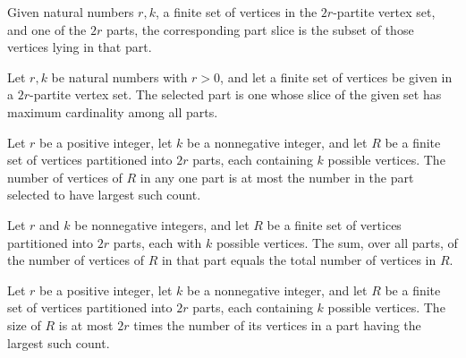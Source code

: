 \begin{definition}
\label{FABL.remainingPartSlice}
\leanok
{}
Given natural numbers $r,k$, a finite set of vertices in the $2r$-partite vertex set,
and one of the $2r$ parts, the corresponding part slice is the subset of those vertices
lying in that part.
\end{definition}

\begin{definition}
\label{FABL.greedyLargestPart}
\leanok
{}
Let $r,k$ be natural numbers with $r>0$, and let a finite set of vertices be given in a
$2r$-partite vertex set. The selected part is one whose slice of the given set has
maximum cardinality among all parts.
\end{definition}

\begin{theorem}
\label{FABL.remainingPartSlice_card_le_greedyLargestPart}
\leanok
{}
Let $r$ be a positive integer, let $k$ be a nonnegative integer, and let $R$ be a finite
set of vertices partitioned into $2r$ parts, each containing $k$ possible vertices. The
number of vertices of $R$ in any one part is at most the number in the part selected to
have largest such count.
\end{theorem}

\begin{theorem}
\label{FABL.sum_card_remainingPartSlice}
\leanok
{}
Let $r$ and $k$ be nonnegative integers, and let $R$ be a finite set of vertices
partitioned into $2r$ parts, each with $k$ possible vertices. The sum, over all parts,
of the number of vertices of $R$ in that part equals the total number of vertices in
$R$.
\end{theorem}

\begin{theorem}
\label{FABL.remaining_card_le_parts_mul_largest}
\leanok
{}
Let $r$ be a positive integer, let $k$ be a nonnegative integer, and let $R$ be a finite
set of vertices partitioned into $2r$ parts, each containing $k$ possible vertices. The
size of $R$ is at most $2r$ times the number of its vertices in a part having the
largest such count.
\end{theorem}

